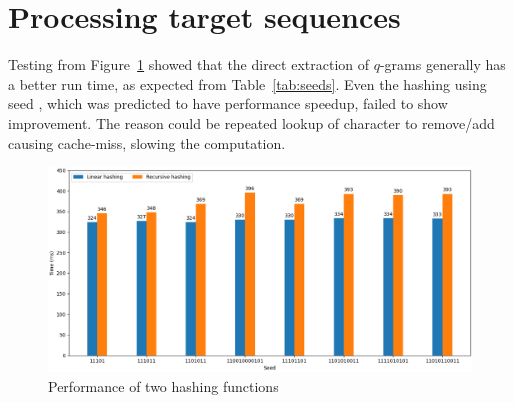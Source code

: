 \documentclass[twoside,a4paper,bsc]{master}
\newcommand{\Qgram}[1]{\(#1\)-gram}
\begin{document}
\section{Processing target sequences}
Testing from Figure~\ref{fig:target_hashing} showed that the direct
extraction of \Qgram{q}s generally has a better run time, as expected from
Table~\ref{tab:seeds}. Even the hashing using seed , which
was
predicted to have performance speedup, failed to show improvement. The
reason
could be repeated lookup of character to remove/add causing cache-miss,
slowing
the computation.
\begin{figure}[t]
\begin{center}
\includegraphics[scale=0.45]{graphics/target_hashing.png}
\end{center}
\caption{Performance of two hashing functions}
\label{fig:target_hashing}
\end{figure}
\end{document}
